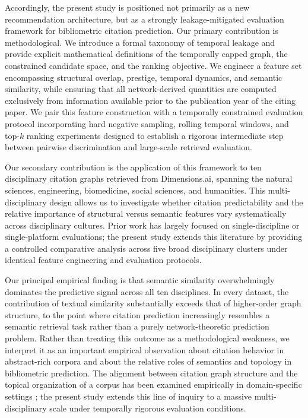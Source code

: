 \documentclass[11pt,a4paper]{article}
\begin{document}
Accordingly, the present study is positioned not primarily as a new recommendation architecture, but as a strongly leakage-mitigated evaluation framework for bibliometric citation prediction. Our primary contribution is methodological. We introduce a formal taxonomy of temporal leakage and provide explicit mathematical definitions of the temporally capped graph, the constrained candidate space, and the ranking objective. We engineer a feature set encompassing structural overlap, prestige, temporal dynamics, and semantic similarity, while ensuring that all network-derived quantities are computed exclusively from information available prior to the publication year of the citing paper. We pair this feature construction with a temporally constrained evaluation protocol incorporating hard negative sampling, rolling temporal windows, and top-$k$ ranking experiments designed to establish a rigorous intermediate step between pairwise discrimination and large-scale retrieval evaluation.

Our secondary contribution is the application of this framework to ten disciplinary citation graphs retrieved from Dimensions.ai, spanning the natural sciences, engineering, biomedicine, social sciences, and humanities. This multi-disciplinary design allows us to investigate whether citation predictability and the relative importance of structural versus semantic features vary systematically across disciplinary cultures. Prior work has largely focused on single-discipline or single-platform evaluations; the present study extends this literature by providing a controlled comparative analysis across five broad disciplinary clusters under identical feature engineering and evaluation protocols.

Our principal empirical finding is that semantic similarity overwhelmingly dominates the predictive signal across all ten disciplines. In every dataset, the contribution of textual similarity substantially exceeds that of higher-order graph structure, to the point where citation prediction increasingly resembles a semantic retrieval task rather than a purely network-theoretic prediction problem. Rather than treating this outcome as a methodological weakness, we interpret it as an important empirical observation about citation behavior in abstract-rich corpora and about the relative roles of semantics and topology in bibliometric prediction. The alignment between citation graph structure and the topical organization of a corpus has been examined empirically in domain-specific settings \citep{boudourides2022citation}; the present study extends this line of inquiry to a massive multi-disciplinary scale under temporally rigorous evaluation conditions.
\end{document}
